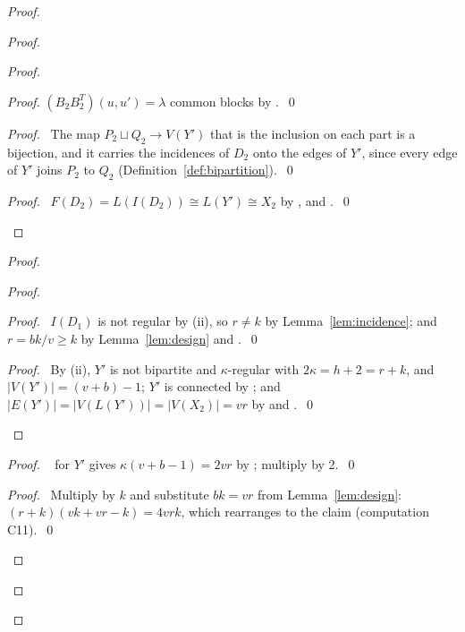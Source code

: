 \begin{proof}
\begin{proof}
\begin{proof}
\begin{proof}
    $(B_2B_2^T)(u,u')=\lambda$ common blocks by .~\qed\end{proof}
   \begin{proof}\pf\ The map $P_2\sqcup Q_2\to V(Y')$ that is the inclusion on each part is a
    bijection, and it carries the incidences of $D_2$ onto the edges of $Y'$, since every edge of
    $Y'$ joins $P_2$ to $Q_2$ (Definition~\ref{def:bipartition}).~\qed\end{proof}
   \qedstep
   \begin{proof}\pf\ $F(D_2)=L(I(D_2))\cong L(Y')\cong X_2$ by ,
     and .~\qed\end{proof}
  \end{proof}
  \begin{proof}
   \begin{proof}
    \begin{proof}\pf\ $I(D_1)$ is not regular by (ii), so $r\ne k$ by
     Lemma~\ref{lem:incidence}; and $r=bk/v\ge k$ by Lemma~\ref{lem:design} and
     .~\qed\end{proof}
    \qedstep
    \begin{proof}\pf\ By (ii), $Y'$ is not bipartite and $\kappa$-regular with
     $2\kappa=h+2=r+k$, and $|V(Y')|=(v+b)-1$; $Y'$ is connected by ; and
     $|E(Y')|=|V(L(Y'))|=|V(X_2)|=vr$ by  and .~\qed\end{proof}
   \end{proof}
   \begin{proof}\pf\  for $Y'$ gives
    $\kappa(v+b-1)=2vr$ by ; multiply by 2.~\qed\end{proof}
   \begin{proof}\pf\ Multiply  by $k$ and substitute $bk=vr$ from
    Lemma~\ref{lem:design}: $(r+k)(vk+vr-k)=4vrk$, which rearranges to the claim (computation
    C11).~\qed\end{proof}

\end{proof}
\end{proof}
\end{proof}
